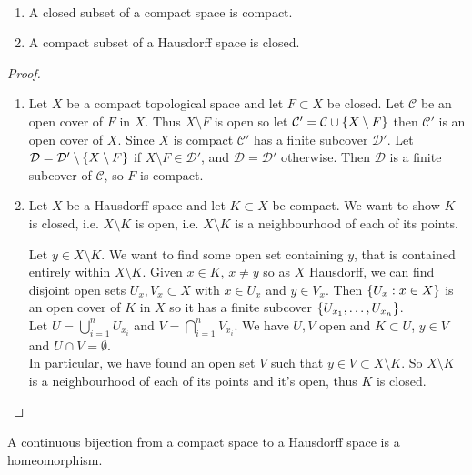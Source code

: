 \begin{lemma} \label{lem:35} ~\vspace*{-1.5\baselineskip}
    \begin{enumerate}
        \item A closed subset of a compact space is compact.
        \item A compact subset of a Hausdorff space is closed.
    \end{enumerate}
\end{lemma}

\begin{proof}
    \begin{enumerate}
        \item Let $X$ be a compact topological space and let $F\subset X$ be closed. Let $\mathcal{C}$ be an open cover of $F$ in $X$.
        Thus $X \setminus F$ is open so let $\mathcal{C}' = \mathcal{C} \cup \{X \setminus F\}$ then $\mathcal{C}'$ is an open cover of $X$.
        Since $X$ is compact $\mathcal{C}'$ has a finite subcover $\mathcal{D}'$.
        Let $\mathcal{D} = \mathcal{D}' \setminus \{X \setminus F\}$ if $X \setminus F \in \mathcal{D}'$, and $\mathcal{D} = \mathcal{D}'$ otherwise.
        Then $\mathcal{D}$ is a finite subcover of $\mathcal{C}$, so $F$ is compact.

        \item Let $X$ be a Hausdorff space and let $K\subset X$ be compact. We want to show $K$ is closed, i.e. $X \setminus K$ is open, i.e. $X \setminus K$ is a neighbourhood of each of its points.

        Let $y\in X \setminus K$. We want to find some open set containing $y$, that is contained entirely within $X \setminus K$. Given $x\in K$, $x\neq y$ so as $X$ Hausdorff, we can find disjoint open sets $U_x, V_x\subset X$ with $x\in U_x$ and $y\in V_x$. Then $\{U_x : x\in X\}$ is an open cover of $K$ in $X$ so it has a finite subcover $\{U_{x_1}, \dots, U_{x_n}\}$. \\
        Let $U = \bigcup_{i=1}^n U_{x_i}$ and $V = \bigcap_{i=1}^n V_{x_i}$.
        We have $U,V$ open and $K\subset U$, $y \in V$ and $U \cap V = \emptyset$. \\
        In particular, we have found an open set $V$ such that $y\in V\subset X \setminus K$. So $X \setminus K$ is a neighbourhood of each of its points and it's open, thus $K$ is closed.
\end{enumerate}
\end{proof}

\begin{theorem} \label{thm:36}
A continuous bijection from a compact space to a Hausdorff space is a homeomorphism.
\end{theorem}

